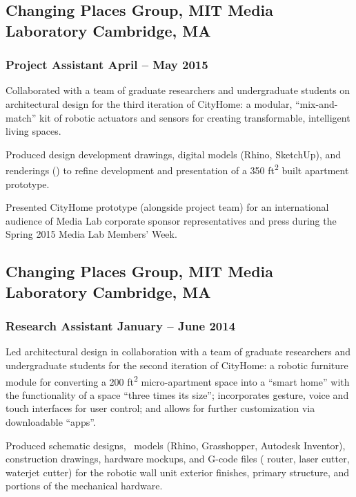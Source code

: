 \documentclass[letterpaper, oneside, 10pt]{article}
\begin{document}
\subsection*{Changing Places Group, MIT Media Laboratory\DotSep{0.25em} Cambridge, MA}

\subsubsection*{Project Assistant\DotSep{0.25em} April -- May 2015}

Collaborated with a team of graduate researchers and undergraduate
students on architectural design for the third iteration of CityHome: a
modular, ``mix-and-match'' kit of robotic actuators and sensors for
creating transformable, intelligent living spaces.

Produced design development drawings, digital models (Rhino, SketchUp),
and renderings (\kern-0.5pt) to refine development and
presentation of a 350 ft\textsuperscript{2} built apartment prototype.

Presented CityHome prototype (alongside project team) for an international
audience of Media Lab corporate sponsor representatives and press during
the Spring 2015  Media Lab Members’ Week.


\subsection*{Changing Places Group, MIT Media Laboratory\DotSep{0.25em} Cambridge, MA}
\subsubsection*{Research Assistant\DotSep{0.25em} January -- June 2014}

Led architectural design in collaboration with a team of graduate
researchers and undergraduate students for the second iteration of
CityHome: a robotic furniture module for converting a 200
ft\textsuperscript{2} micro-apartment space into a ``smart home'' with the
functionality of a space ``three times its size''; incorporates gesture,
voice and touch interfaces for user control; and allows for further
customization via downloadable ``apps''.

Produced schematic designs, \ models (Rhino, Grasshopper, Autodesk
Inventor), construction drawings, hardware mockups, and G-code files
( router, laser cutter, waterjet cutter) for the robotic
wall unit exterior finishes, primary structure, and portions of the
mechanical hardware.
\end{document}
